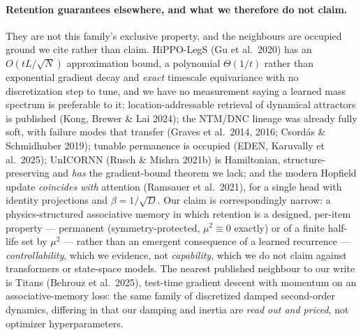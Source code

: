 \documentclass{article}
\begin{document}
\paragraph{Retention guarantees elsewhere, and what we therefore do not claim.} They are not this family's exclusive property, and the neighbours are occupied ground we cite rather than claim. HiPPO-LegS (Gu et al.\ 2020) has an $O(tL/\sqrt N)$ approximation bound, a polynomial $\Theta(1/t)$ rather than exponential gradient decay and \emph{exact} timescale equivariance with no discretization step to tune, and we have no measurement saying a learned mass spectrum is preferable to it; location-addressable retrieval of dynamical attractors is published (Kong, Brewer \& Lai 2024); the NTM/DNC lineage was already fully soft, with failure modes that transfer (Graves et al.\ 2014, 2016; Csord\'as \& Schmidhuber 2019); tunable permanence is occupied (EDEN, Karuvally et al.\ 2025); UnICORNN (Rusch \& Mishra 2021b) is Hamiltonian, structure-preserving and \emph{has} the gradient-bound theorem we lack; and the modern Hopfield update \emph{coincides with} attention (Ramsauer et al.\ 2021), for a single head with identity projections and $\beta=1/\sqrt D$. Our claim is correspondingly narrow: a physics-structured associative memory in which retention is a designed, per-item property --- permanent (symmetry-protected, $\mu^2\equiv0$ exactly) or of a finite half-life set by $\mu^2$ --- rather than an emergent consequence of a learned recurrence --- \emph{controllability}, which we evidence, not \emph{capability}, which we do not claim against transformers or state-space models. The nearest published neighbour to our write is Titans (Behrouz et al.\ 2025), test-time gradient descent with momentum on an associative-memory loss: the same family of discretized damped second-order dynamics, differing in that our damping and inertia are \emph{read out and priced}, not optimizer hyperparameters.
\end{document}
